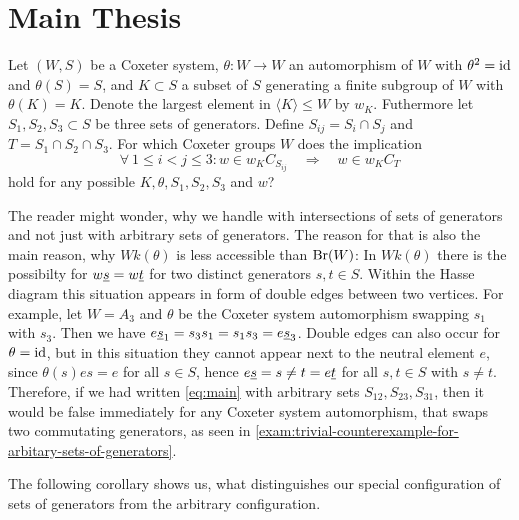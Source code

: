 \section{Main Thesis}
\label{sec:main-thesis}

\begin{ques}
	Let $(W,S)$ be a Coxeter system, $\theta : W \to W$ an automorphism of $W$ with $\theta^2 = \operatorname{id}$ and $\theta(S) = S$, and $K \subset S$ a subset of $S$ generating a finite subgroup of $W$ with $\theta(K) = K$. Denote the largest element in $\langle K \rangle \leq W$ by $w_K$. Futhermore let $S_1,S_2,S_3 \subset S$ be three sets of generators. Define $S_{ij} = S_i \cap S_j$ and $T = S_1 \cap S_2 \cap S_3$. For which Coxeter groups $W$ does the implication
	\begin{equation}
		\label{eq:main}
		\forall \ 1 \leq i < j \leq 3 : w \in w_K C_{S_{ij}} \quad \Rightarrow \quad w \in w_K C_T
	\end{equation}
	hold for any possible $K,\theta,S_1,S_2,S_3$ and $w$?
\end{ques}

The reader might wonder, why we handle with intersections of sets of generators and not just with arbitrary sets of generators. The reason for that is also the main reason, why $Wk(\theta)$ is less accessible than $\operatorname{Br}(W)$: In $Wk(\theta)$ there is the possibilty for $w \underline{s} = w \underline{t}$ for two distinct generators $s,t \in S$. Within the Hasse diagram this situation appears in form of double edges between two vertices. For example, let $W = A_3$ and $\theta$ be the Coxeter system automorphism swapping $s_1$ with $s_3$. Then we have $e \underline{s}_1 = s_3 s_1 = s_1 s_3 = e \underline{s}_3$. Double edges can also occur for $\theta = \operatorname{id}$, but in this situation they cannot appear next to the neutral element $e$, since $\theta(s)es = e$ for all $s \in S$, hence $e \underline{s} = s \neq t = e \underline{t}$ for all $s,t \in S$ with $s \neq t$. Therefore, if we had written \ref{eq:main} with arbitrary sets $S_{12},S_{23},S_{31}$, then it would be false immediately for any Coxeter system automorphism, that swaps two commutating generators, as seen in \ref{exam:trivial-counterexample-for-arbitary-sets-of-generators}.

The following corollary shows us, what distinguishes our special configuration of sets of generators from the arbitrary configuration.


